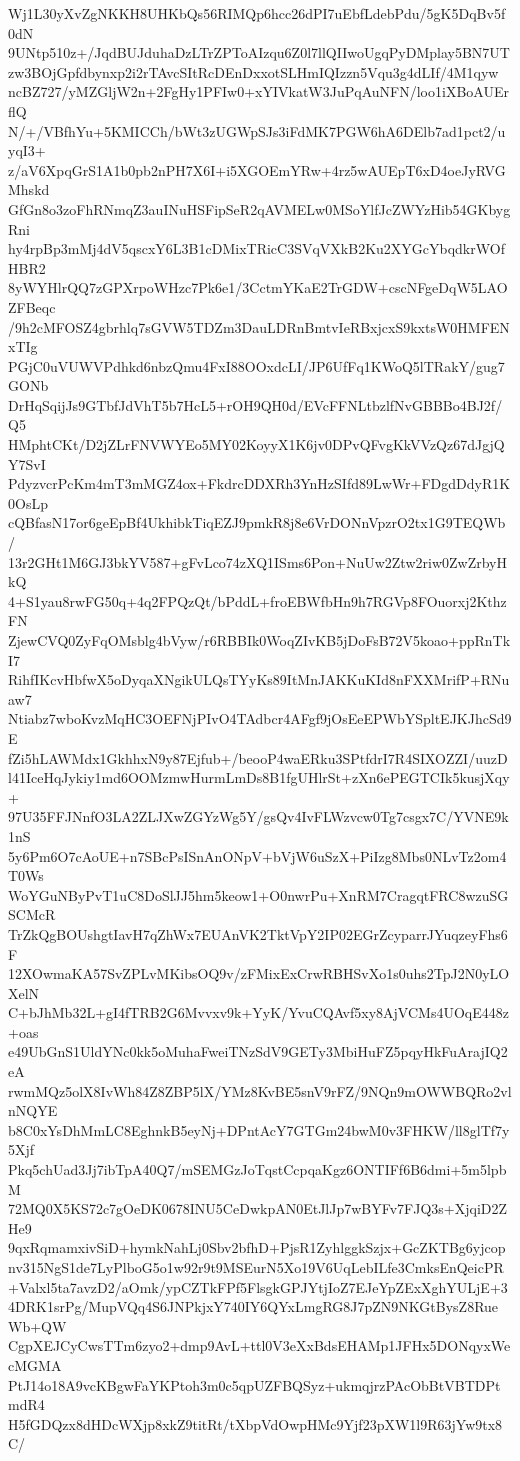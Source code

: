 Wj1L30yXvZgNKKH8UHKbQs56RIMQp6hcc26dPI7uEbfLdebPdu/5gK5DqBv5f0dN
9UNtp510z+/JqdBUJduhaDzLTrZPToAIzqu6Z0l7llQIIwoUgqPyDMplay5BN7UT
zw3BOjGpfdbynxp2i2rTAvcSItRcDEnDxxotSLHmIQIzzn5Vqu3g4dLIf/4M1qyw
ncBZ727/yMZGljW2n+2FgHy1PFIw0+xYIVkatW3JuPqAuNFN/loo1iXBoAUErflQ
N/+/VBfhYu+5KMICCh/bWt3zUGWpSJs3iFdMK7PGW6hA6DElb7ad1pct2/uyqI3+
z/aV6XpqGrS1A1b0pb2nPH7X6I+i5XGOEmYRw+4rz5wAUEpT6xD4oeJyRVGMhskd
GfGn8o3zoFhRNmqZ3auINuHSFipSeR2qAVMELw0MSoYlfJcZWYzHib54GKbygRni
hy4rpBp3mMj4dV5qscxY6L3B1cDMixTRicC3SVqVXkB2Ku2XYGcYbqdkrWOfHBR2
8yWYHlrQQ7zGPXrpoWHzc7Pk6e1/3CctmYKaE2TrGDW+cscNFgeDqW5LAOZFBeqc
/9h2cMFOSZ4gbrhlq7sGVW5TDZm3DauLDRnBmtvIeRBxjcxS9kxtsW0HMFENxTIg
PGjC0uVUWVPdhkd6nbzQmu4FxI88OOxdcLI/JP6UfFq1KWoQ5lTRakY/gug7GONb
DrHqSqijJs9GTbfJdVhT5b7HcL5+rOH9QH0d/EVcFFNLtbzlfNvGBBBo4BJ2f/Q5
HMphtCKt/D2jZLrFNVWYEo5MY02KoyyX1K6jv0DPvQFvgKkVVzQz67dJgjQY7SvI
PdyzvcrPcKm4mT3mMGZ4ox+FkdrcDDXRh3YnHzSIfd89LwWr+FDgdDdyR1K0OsLp
cQBfasN17or6geEpBf4UkhibkTiqEZJ9pmkR8j8e6VrDONnVpzrO2tx1G9TEQWb/
13r2GHt1M6GJ3bkYV587+gFvLco74zXQ1ISms6Pon+NuUw2Ztw2riw0ZwZrbyHkQ
4+S1yau8rwFG50q+4q2FPQzQt/bPddL+froEBWfbHn9h7RGVp8FOuorxj2KthzFN
ZjewCVQ0ZyFqOMsblg4bVyw/r6RBBIk0WoqZIvKB5jDoFsB72V5koao+ppRnTkI7
RihfIKcvHbfwX5oDyqaXNgikULQsTYyKs89ItMnJAKKuKId8nFXXMrifP+RNuaw7
Ntiabz7wboKvzMqHC3OEFNjPIvO4TAdbcr4AFgf9jOsEeEPWbYSpltEJKJhcSd9E
fZi5hLAWMdx1GkhhxN9y87Ejfub+/beooP4waERku3SPtfdrI7R4SIXOZZI/uuzD
l41IceHqJykiy1md6OOMzmwHurmLmDs8B1fgUHlrSt+zXn6ePEGTCIk5kusjXqy+
97U35FFJNnfO3LA2ZLJXwZGYzWg5Y/gsQv4IvFLWzvcw0Tg7csgx7C/YVNE9k1nS
5y6Pm6O7cAoUE+n7SBcPsISnAnONpV+bVjW6uSzX+PiIzg8Mbs0NLvTz2om4T0Ws
WoYGuNByPvT1uC8DoSlJJ5hm5keow1+O0nwrPu+XnRM7CragqtFRC8wzuSGSCMcR
TrZkQgBOUshgtIavH7qZhWx7EUAnVK2TktVpY2IP02EGrZcyparrJYuqzeyFhs6F
12XOwmaKA57SvZPLvMKibsOQ9v/zFMixExCrwRBHSvXo1s0uhs2TpJ2N0yLOXelN
C+bJhMb32L+gI4fTRB2G6Mvvxv9k+YyK/YvuCQAvf5xy8AjVCMs4UOqE448z+oas
e49UbGnS1UldYNc0kk5oMuhaFweiTNzSdV9GETy3MbiHuFZ5pqyHkFuArajIQ2eA
rwmMQz5olX8IvWh84Z8ZBP5lX/YMz8KvBE5snV9rFZ/9NQn9mOWWBQRo2vlnNQYE
b8C0xYsDhMmLC8EghnkB5eyNj+DPntAcY7GTGm24bwM0v3FHKW/ll8glTf7y5Xjf
Pkq5chUad3Jj7ibTpA40Q7/mSEMGzJoTqstCcpqaKgz6ONTIFf6B6dmi+5m5lpbM
72MQ0X5KS72c7gOeDK0678INU5CeDwkpAN0EtJlJp7wBYFv7FJQ3s+XjqiD2ZHe9
9qxRqmamxivSiD+hymkNahLj0Sbv2bfhD+PjsR1ZyhlggkSzjx+GcZKTBg6yjcop
nv315NgS1de7LyPlboG5o1w92r9t9MSEurN5Xo19V6UqLebILfe3CmksEnQeicPR
+Valxl5ta7avzD2/aOmk/ypCZTkFPf5FlsgkGPJYtjIoZ7EJeYpZExXghYULjE+3
4DRK1srPg/MupVQq4S6JNPkjxY740IY6QYxLmgRG8J7pZN9NKGtBysZ8RueWb+QW
CgpXEJCyCwsTTm6zyo2+dmp9AvL+ttl0V3eXxBdsEHAMp1JFHx5DONqyxWecMGMA
PtJ14o18A9vcKBgwFaYKPtoh3m0c5qpUZFBQSyz+ukmqjrzPAcObBtVBTDPtmdR4
H5fGDQzx8dHDcWXjp8xkZ9titRt/tXbpVdOwpHMc9Yjf23pXW1l9R63jYw9tx8C/
